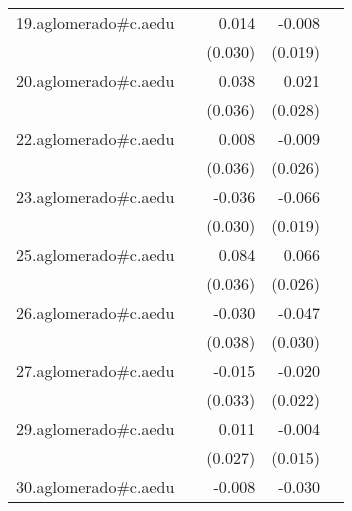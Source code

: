 {\begin{longtable}{l*{4}{D{.}{.}{-1}}}
\addlinespace
19.aglomerado#c.aedu&                     &       0.014         &      -0.008         &                     \\
            &                     &     (0.030)         &     (0.019)         &                     \\
\addlinespace
20.aglomerado#c.aedu&                     &       0.038         &       0.021         &                     \\
            &                     &     (0.036)         &     (0.028)         &                     \\
\addlinespace
22.aglomerado#c.aedu&                     &       0.008         &      -0.009         &                     \\
            &                     &     (0.036)         &     (0.026)         &                     \\
\addlinespace
23.aglomerado#c.aedu&                     &      -0.036         &      -0.066\sym{***}&                     \\
            &                     &     (0.030)         &     (0.019)         &                     \\
\addlinespace
25.aglomerado#c.aedu&                     &       0.084\sym{*}  &       0.066\sym{*}  &                     \\
            &                     &     (0.036)         &     (0.026)         &                     \\
\addlinespace
26.aglomerado#c.aedu&                     &      -0.030         &      -0.047         &                     \\
            &                     &     (0.038)         &     (0.030)         &                     \\
\addlinespace
27.aglomerado#c.aedu&                     &      -0.015         &      -0.020         &                     \\
            &                     &     (0.033)         &     (0.022)         &                     \\
\addlinespace
29.aglomerado#c.aedu&                     &       0.011         &      -0.004         &                     \\
            &                     &     (0.027)         &     (0.015)         &                     \\
\addlinespace
30.aglomerado#c.aedu&                     &      -0.008         &      -0.030         &                     \\

\end{longtable}}
